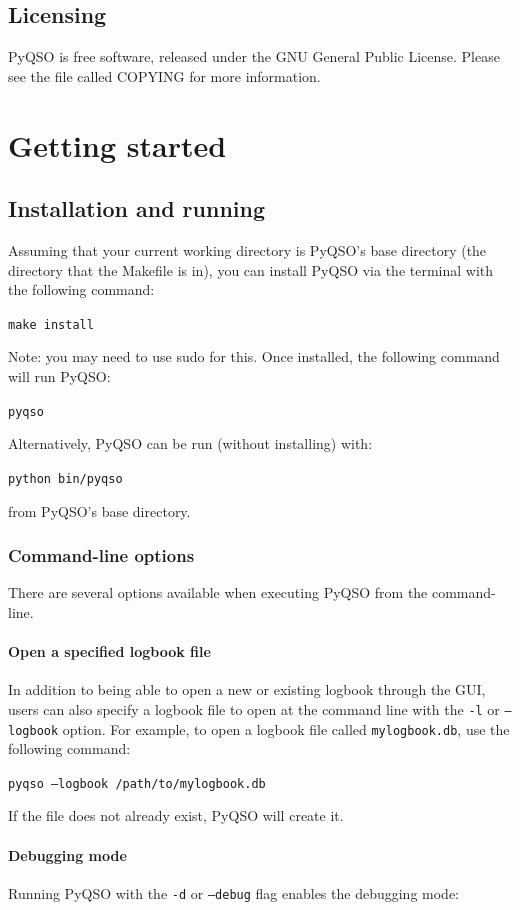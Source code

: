 \documentclass[11pt, a4paper]{report}
\begin{document}
\section{Licensing}
PyQSO is free software, released under the GNU General Public License. Please see the file called COPYING for more information.


\chapter{Getting started}\label{chap:getting_started}

\section{Installation and running}
Assuming that your current working directory is PyQSO's base directory (the directory that the Makefile is in), you can install PyQSO via the terminal with the following command:

  \texttt{make install}

\noindent Note: you may need to use sudo for this. Once installed, the following command will run PyQSO:

  \texttt{pyqso}

\noindent Alternatively, PyQSO can be run (without installing) with:

  \texttt{python bin/pyqso}

\noindent from PyQSO's base directory.

\subsection{Command-line options}
There are several options available when executing PyQSO from the command-line.

\subsubsection{Open a specified logbook file}
In addition to being able to open a new or existing logbook through the GUI, users can also specify a logbook file to open at the command line with the \texttt{-l} or \texttt{--logbook} option. For example, to open a logbook file called \texttt{mylogbook.db}, use the following command:

  \texttt{pyqso --logbook /path/to/mylogbook.db}

If the file does not already exist, PyQSO will create it.

\subsubsection{Debugging mode}
Running PyQSO with the \texttt{-d} or \texttt{--debug} flag enables the debugging mode:
\end{document}
